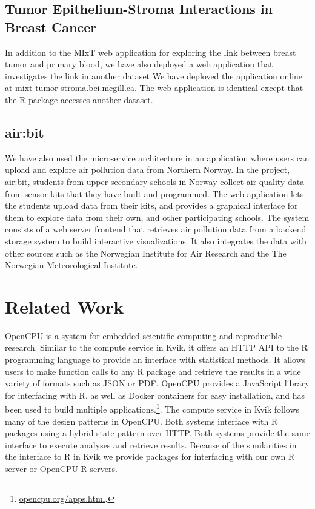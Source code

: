 \subsection{Tumor Epithelium-Stroma Interactions in Breast Cancer}
In addition to the MIxT web application for exploring the link between breast
tumor and primary blood, we have also deployed a web application that
investigates the link in another dataset\cite{boersma2008stromal} We have
deployed the application online at \url{mixt-tumor-stroma.bci.mcgill.ca}. The
web application is identical except that the R package accesses another dataset. 

\subsection{air:bit}
We have also used the microservice architecture in an application where users
can upload and explore air pollution data from Northern
Norway.\cite{fjukstad2018low} In the project, air:bit, students from upper
secondary schools in Norway collect air quality data from sensor kits that they
have built and programmed. The web application lets the students upload data
from their kits, and provides a graphical interface for them to explore data
from their own, and other participating schools. The system consists of a web
server frontend that retrieves air pollution data from a backend storage system
to build interactive visualizations. It also integrates the data with other
sources such as the Norwegian Institute for Air Research and the The Norwegian
Meteorological Institute. 

    
\section{Related Work} 
OpenCPU is a system for embedded scientific computing and reproducible
research.\cite{opencpu} Similar to the compute service in Kvik, it offers an
HTTP API to the R programming language to provide an interface with statistical
methods. It allows users to make function calls to any R package and retrieve
the results in a wide variety of formats such as JSON or PDF. 
OpenCPU provides a JavaScript library for interfacing with R, as well as Docker
containers for easy installation, and has been used to build multiple
applications.\footnote{\url{opencpu.org/apps.html}.}. The compute service in
Kvik follows many of the design patterns in OpenCPU. Both systems interface with
R packages using a hybrid state pattern over HTTP. Both systems provide the same
interface to execute analyses and retrieve results.  Because of the similarities
in the interface to R in Kvik we provide packages for interfacing with our own R
server or OpenCPU R servers.

